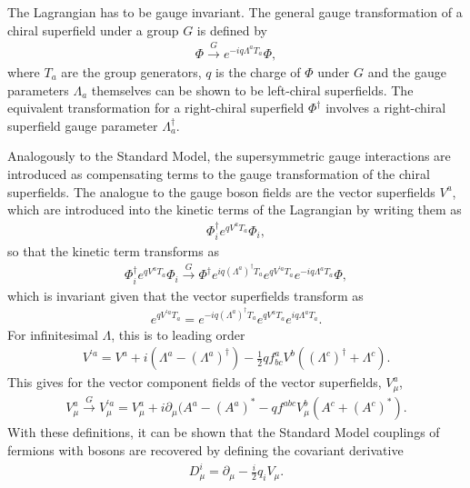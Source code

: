 \documentclass[twoside,english]{uiofysmaster}
\begin{document}
The Lagrangian has to be gauge invariant. The general gauge transformation of a chiral superfield under a group $G$ is defined by
\begin{align}
	\Phi \overset{G}{\to} e^{-iq\Lambda^a T_a}\Phi,
\end{align}
where $T_a$ are the group generators, $q$ is the charge of $\Phi$ under $G$ and the gauge parameters $\Lambda_a$ themselves can be shown to be left-chiral superfields. The equivalent transformation for a right-chiral superfield $\Phi^\dag$ involves a right-chiral superfield gauge parameter $\Lambda_a^\dag$.

Analogously to the Standard Model, the supersymmetric gauge interactions are introduced as compensating terms to the gauge transformation of the chiral superfields. The analogue to the gauge boson fields are the vector superfields $V^a$, which are introduced into the kinetic terms of the Lagrangian by writing them as
\begin{align}
	\Phi^\dag_i e^{q V^a T_a}\Phi_i,
\end{align}
so that the kinetic term transforms as
\begin{align}
	\Phi_i^\dag e^{q V^a T_a}\Phi_i \overset{G}{\to} \Phi^\dag e^{iq(\Lambda^a)^\dag T_a}e^{qV^{'a}T_a}e^{-iq\Lambda^a T_a}\Phi,
\end{align}
which is invariant given that the vector superfields transform as
\begin{align}
	e^{qV^{'a} T_a} = e^{-iq(\Lambda^a)^\dag T_a}e^{qV^a T_a}e^{iq\Lambda^a T_a}.
\end{align}
For infinitesimal $\Lambda$, this is to leading order
\begin{align}
	V^{'a} = V^a + i(\Lambda^a - (\Lambda^a)^\dag) - \frac{1}{2}qf^a_{bc} V^b ((\Lambda^c)^\dag + \Lambda^c).
\end{align}
This gives for the vector component fields of the vector superfields, $V_\mu^a$,
\begin{align}
	V^a_\mu \overset{G}{\to} V^{'a}_\mu = V_\mu^a + i\partial_\mu(A^a - (A^a)^* - qf^{abc} V_\mu^b (A^c + (A^{c})^*).
\end{align}
With these definitions, it can be shown that the Standard Model couplings of fermions with bosons are recovered by defining the covariant derivative
\begin{align}
	D_\mu^i = \partial_\mu - \frac{i}{2} q_i V_\mu.
\end{align}
\end{document}
